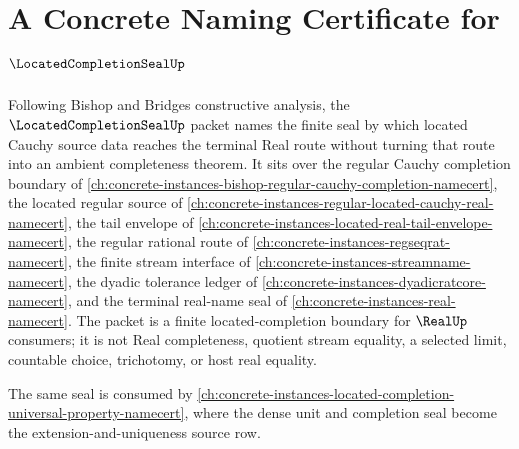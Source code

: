 \chapter{A Concrete Naming Certificate for $\LocatedCompletionSealUp$}
\label{ch:concrete-instances-located-completion-seal-namecert}

Following Bishop and Bridges constructive analysis, the $\LocatedCompletionSealUp$ packet names the finite seal by which located Cauchy source data reaches the terminal Real route without turning that route into an ambient completeness theorem. It sits over the regular Cauchy completion boundary of \autoref{ch:concrete-instances-bishop-regular-cauchy-completion-namecert}, the located regular source of \autoref{ch:concrete-instances-regular-located-cauchy-real-namecert}, the tail envelope of \autoref{ch:concrete-instances-located-real-tail-envelope-namecert}, the regular rational route of \autoref{ch:concrete-instances-regseqrat-namecert}, the finite stream interface of \autoref{ch:concrete-instances-streamname-namecert}, the dyadic tolerance ledger of \autoref{ch:concrete-instances-dyadicratcore-namecert}, and the terminal real-name seal of \autoref{ch:concrete-instances-real-namecert}. The packet is a finite located-completion boundary for $\RealUp$ consumers; it is not Real completeness, quotient stream equality, a selected limit, countable choice, trichotomy, or host real equality.

The same seal is consumed by \autoref{ch:concrete-instances-located-completion-universal-property-namecert}, where the dense unit and completion seal become the extension-and-uniqueness source row.

